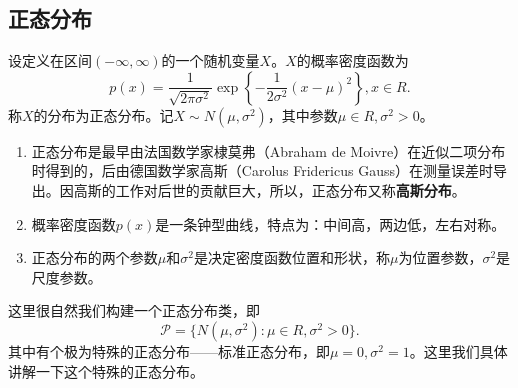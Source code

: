 \subsection{正态分布}
\begin{definition}\label{def:normal_dist}
设定义在区间$(-\infty,\infty)$的一个随机变量$X$。$X$的概率密度函数为
$$
p(x) =\frac{1}{\sqrt{2\pi \sigma^2}}\exp\left\{-\frac{1}{2\sigma^2} (x-\mu)^2\right\}, x \in R.
$$
称$X$的分布为正态分布。记$X\sim N(\mu,\sigma^2)$，其中参数$\mu \in R, \sigma^2 >0$。
\end{definition}
\begin{remark}
    \begin{enumerate}
        \item 正态分布是最早由法国数学家棣莫弗（Abraham de Moivre）在近似二项分布时得到的，后由德国数学家高斯（Carolus Fridericus Gauss）在测量误差时导出。因高斯的工作对后世的贡献巨大，所以，正态分布又称{\bf 高斯分布}。
        \item 概率密度函数$p(x)$是一条钟型曲线，特点为：中间高，两边低，左右对称。
        \item 正态分布的两个参数$\mu$和$\sigma^2$是决定密度函数位置和形状，称$\mu$为位置参数，$\sigma^2$是尺度参数。
    \end{enumerate}
\end{remark}
这里很自然我们构建一个正态分布类，即
$$
\mathcal{P} = \{N(\mu,\sigma^2):\mu \in R, \sigma^2 >0\}.
$$
其中有个极为特殊的正态分布——标准正态分布，即$\mu = 0,\sigma^2 = 1$。这里我们具体讲解一下这个特殊的正态分布。

